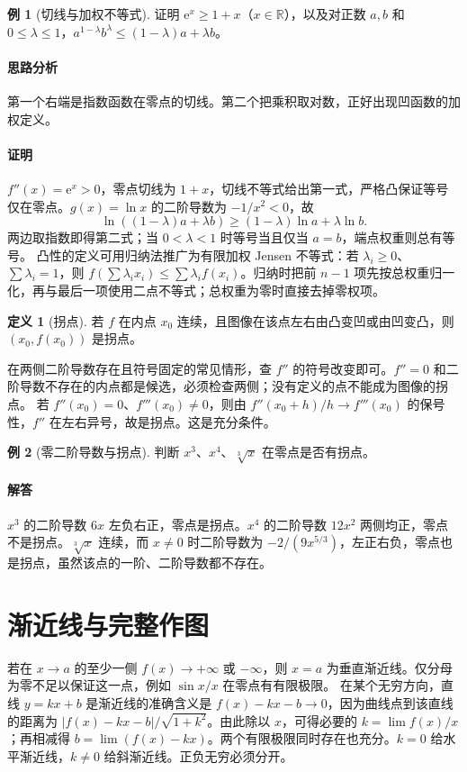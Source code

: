 \documentclass[UTF8,fontset=fandol,12pt,oneside,openany]{ctexrep}
\newcommand{\R}{\mathbb R}
\newcommand{\ee}{\mathrm e}
\theoremstyle{definition}
\newtheorem{definition}[theorem]{定义}
\newtheorem{example}{例}[chapter]
\begin{document}
\begin{example}[切线与加权不等式]
证明 $\ee^x\ge1+x$（$x\in\R$），以及对正数 $a,b$ 和 $0\le\lambda\le1$，$a^{1-\lambda}b^\lambda\le(1-\lambda)a+\lambda b$。
\end{example}
\paragraph{思路分析}第一个右端是指数函数在零点的切线。第二个把乘积取对数，正好出现凹函数的加权定义。
\paragraph{证明}$f''(x)=\ee^x>0$，零点切线为 $1+x$，切线不等式给出第一式，严格凸保证等号仅在零点。$g(x)=\ln x$ 的二阶导数为 $-1/x^2<0$，故
\[\ln((1-\lambda)a+\lambda b)\ge(1-\lambda)\ln a+\lambda\ln b.\]
两边取指数即得第二式；当 $0<\lambda<1$ 时等号当且仅当 $a=b$，端点权重则总有等号。
凸性的定义可用归纳法推广为有限加权 Jensen 不等式：若 $\lambda_i\ge0$、$\sum\lambda_i=1$，则 $f(\sum\lambda_i x_i)\le\sum\lambda_i f(x_i)$。归纳时把前 $n-1$ 项先按总权重归一化，再与最后一项使用二点不等式；总权重为零时直接去掉零权项。

\begin{definition}[拐点]
若 $f$ 在内点 $x_0$ 连续，且图像在该点左右由凸变凹或由凹变凸，则 $(x_0,f(x_0))$ 是拐点。
\end{definition}
在两侧二阶导数存在且符号固定的常见情形，查 $f''$ 的符号改变即可。$f''=0$ 和二阶导数不存在的内点都是候选，必须检查两侧；没有定义的点不能成为图像的拐点。
若 $f''(x_0)=0$、$f'''(x_0)\ne0$，则由 $f''(x_0+h)/h\to f'''(x_0)$ 的保号性，$f''$ 在左右异号，故是拐点。这是充分条件。

\begin{example}[零二阶导数与拐点]
判断 $x^3$、$x^4$、$\sqrt[3]{x}$ 在零点是否有拐点。
\end{example}
\paragraph{解答}$x^3$ 的二阶导数 $6x$ 左负右正，零点是拐点。$x^4$ 的二阶导数 $12x^2$ 两侧均正，零点不是拐点。$\sqrt[3]{x}$ 连续，而 $x\ne0$ 时二阶导数为 $-2/(9x^{5/3})$，左正右负，零点也是拐点，虽然该点的一阶、二阶导数都不存在。

\section{渐近线与完整作图}
\label{lec:09:asymptotes}
若在 $x\to a$ 的至少一侧 $f(x)\to+\infty$ 或 $-\infty$，则 $x=a$ 为垂直渐近线。仅分母为零不足以保证这一点，例如 $\sin x/x$ 在零点有有限极限。
在某个无穷方向，直线 $y=kx+b$ 是渐近线的准确含义是 $f(x)-kx-b\to0$，因为曲线点到该直线的距离为 $|f(x)-kx-b|/\sqrt{1+k^2}$。由此除以 $x$，可得必要的 $k=\lim f(x)/x$；再相减得 $b=\lim(f(x)-kx)$。两个有限极限同时存在也充分。$k=0$ 给水平渐近线，$k\ne0$ 给斜渐近线。正负无穷必须分开。
\end{document}
